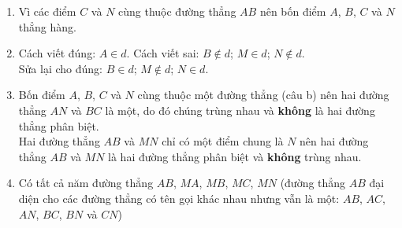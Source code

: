 \begin{vd}
{\begin{enumerate}
{
			}
			\item Vì các điểm $C$ và $N$ cùng thuộc đường thẳng $AB$ nên bốn điểm $A$, $B$, $C$ và $N$ thẳng hàng.
			\item Cách viết đúng: $A\in d$. Cách viết sai: $B\notin d$; $M\in d$; $N\notin d$.\\
			Sửa lại cho đúng: $B\in d$; $M\notin d$; $N\in d$.
			\item Bốn điểm $A$, $B$, $C$ và $N$ cùng thuộc một đường thẳng (câu b) nên hai đường thẳng $AN$ và $BC$ là một, do đó chúng trùng nhau và \textbf{không} là hai đường thẳng phân biệt.\\
			Hai đường thẳng $AB$ và $MN$ chỉ có một điểm chung là $N$ nên hai đường thẳng $AB$ và $MN$ là hai đường thẳng phân biệt và \textbf{không} trùng nhau.
			\item Có tất cả năm đường thẳng $AB$, $MA$, $MB$, $MC$, $MN$ (đường thẳng $AB$ đại diện cho các đường thẳng có tên gọi khác nhau nhưng vẫn là một: $AB$, $AC$, $AN$, $BC$, $BN$ và $CN$)
		\end{enumerate}
	}
\end{vd}

